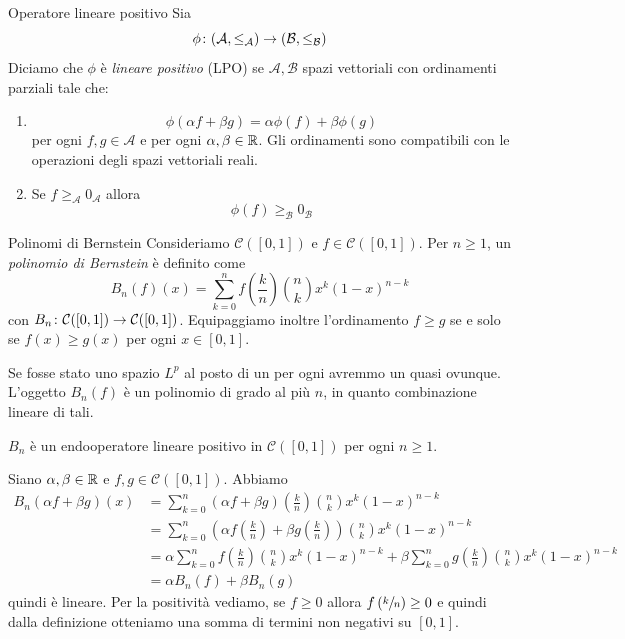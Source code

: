 \documentclass[a4paper]{article}
\begin{document}
\begin{snippetdefinition}{Operatore lineare positivo}
    Sia
    \[
        \phi \colon (\mathcal A, \leq_{\mathcal A}) \to (\mathcal B, \leq_{\mathcal B})
    \]
    Diciamo che \(\phi\) è \emph{lineare positivo} (LPO) se
    \(\mathcal A, \mathcal B\)
    spazi vettoriali con ordinamenti parziali tale che:
    \begin{enumerate}
        \item \[
                \phi(\alpha f  + \beta g) = \alpha \phi(f) + \beta\phi(g)
            \]
            per ogni \(f,g \in \mathcal A\)
            e per ogni \(\alpha,\beta \in \mathbb{R}\). Gli ordinamenti sono compatibili con le operazioni degli spazi vettoriali reali.
        \item Se \(f \geq_{\mathcal A} 0_{\mathcal A}\) allora \[
                \phi(f) \geq_{\mathcal B} 0_{\mathcal B}
            \]
    \end{enumerate}
\end{snippetdefinition}

\begin{snippetdefinition}{Polinomi di Bernstein}
    Consideriamo \(\mathcal C([0,1])\) e \(f \in \mathcal C([0,1])\).
    Per \(n\geq 1\), un \emph{polinomio di Bernstein} è definito come
    \[
        B_n(f)(x) = \sum_{k=0}^n f\left(\frac kn\right) \binom{n}{k} x^k (1-x)^{n-k}
    \]
    con \(B_n \colon \mathcal C([0,1]) \to \mathcal C([0,1])\).
    Equipaggiamo inoltre l'ordinamento \(f \geq g\) se e solo se
    \(f(x) \geq g(x)\) per ogni \(x \in [0,1]\).
\end{snippetdefinition}

Se fosse stato uno spazio \(L^p\) al posto di un per ogni avremmo un quasi ovunque.
L'oggetto \(B_n(f)\) è un polinomio di grado al più \(n\), in quanto combinazione lineare di tali.

\begin{snippetproposition}{}
    \(B_n\) è un endooperatore lineare positivo in \(\mathcal C([0,1])\) per ogni \(n\geq 1\).
\end{snippetproposition}

\begin{snippetproof}{}
    Siano \(\alpha, \beta \in \mathbb{R}\) e \(f,g \in \mathcal C([0,1])\).
    Abbiamo
    \begin{align*}
        B_n(\alpha f + \beta g)(x) &= \sum_{k=0}^n \left(\alpha f + \beta g\right)\left(\frac{k}{n}\right)
        \binom{n}{k} x^k(1-x)^{n-k} \\
        &= \sum_{k=0}^n \left(
            \alpha f\left(\frac{k}{n}\right) + \beta g\left(\frac{k}{n}\right)
        \right) \binom{n}{k}x^k(1-x)^{n-k} \\
        &= \alpha \sum_{k=0}^n f\left(\frac kn\right) \binom{n}{k} x^k (1-x)^{n-k}
        + \beta \sum_{k=0}^n g\left(\frac kn\right) \binom{n}{k} x^k (1-x)^{n-k} \\
        &= \alpha B_n(f) + \beta B_n(g)
    \end{align*}
    quindi è lineare. Per la positività vediamo,
    se \(f \geq 0\) allora \(f\left(\sfrac kn\right) \geq 0\) e quindi dalla definizione
    otteniamo una somma di termini non negativi su \([0,1]\).
\end{snippetproof}
\end{document}
